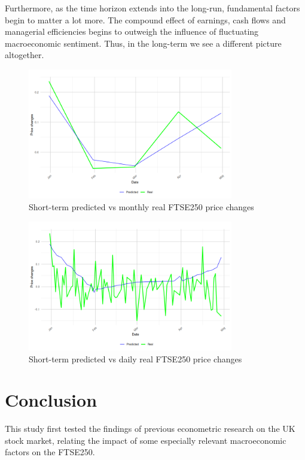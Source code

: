 \documentclass[12pt,a4paper]{article}
\begin{document}
Furthermore, as the time horizon extends into the long-run, fundamental factors 
begin to matter a lot more. The compound effect of earnings, cash flows and
managerial efficiencies begins to outweigh the 
influence of fluctuating macroeconomic sentiment. Thus, in the long-term
we see a different picture altogether.

\begin{figure}[h]
    \centering
    \includegraphics[width=0.8\textwidth]{short-term-monthly.png}
    \caption{Short-term predicted vs monthly real FTSE250 price changes}
    \label{fig:smonthly}
\end{figure}

\begin{figure}[h]
    \centering
    \includegraphics[width=0.8\textwidth]{short-term-daily.png}
    \caption{Short-term predicted vs daily real FTSE250 price changes}
    \label{fig:sdaily}
\end{figure}

\section{Conclusion}

This study first tested the findings of previous econometric research on the 
UK stock market, relating the impact of some especially
relevant macroeconomic factors on the FTSE250. 
\end{document}
